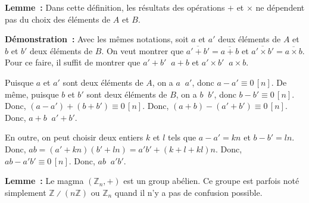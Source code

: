 \medskip

\noindent\textbf{Lemme :} Dans cette définition, les résultats des opérations $+$ et $\times$ ne dépendent pas du choix des éléments de $A$ et $B$.

\medskip

\noindent\textbf{Démonstration :} Avec les mêmes notations, soit $a$ et $a'$ deux éléments de $A$ et $b$ et $b'$ deux éléments de $B$.
    On veut montrer que $\overline{a' + b'} = \overline{a + b}$ et $\overline{a' \times b'} = \overline{a \times b}$.
    Pour ce faire, il suffit de montrer que $a' + b' \mathop{R_n} a + b$ et $a' \times b' \mathop{R_n} a \times b$.

    Puisque $a$ et $a'$ sont deux éléments de $A$, on a $a \mathop{R_n} a'$, donc $a - a' \equiv 0 \, [n]$.
    De même, puisque $b$ et $b'$ sont deux éléments de $B$, on a $b \mathop{R_n} b'$, donc $b - b' \equiv 0 \, [n]$.
    Donc, $(a - a') + (b + b') \equiv 0 \, [n]$. 
    Donc, $(a + b) - (a' + b') \equiv 0 \, [n]$.
    Donc, $a + b \mathop{R_n} a' + b'$.

    En outre, on peut choisir deux entiers $k$ et $l$ tels que $a - a' = k n$ et $b - b' = l n$.
    Donc, $a b = (a' + k n) (b' + l n) = a' b' + (k + l + k l) n$.
    Donc, $a b - a' b' \equiv 0 \, [n]$.
    Donc, $a b \mathop{R_n} a' b'$.

    \done

\medskip

\noindent\textbf{Lemme :} Le magma $\left( \mathbb{Z}_n, + \right)$ est un group abélien. 
    Ce groupe est parfois noté simplement $\mathbb{Z} \divslash (n \mathbb{Z})$ ou $\mathbb{Z}_n$ quand il n'y a pas de confusion possible.

\medskip

